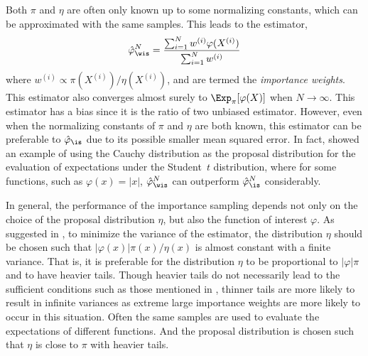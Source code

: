 Both $\pi$ and $\eta$ are often only known up to some normalizing constants,
which can be approximated with the same samples. This leads to the estimator,
\begin{equation}
  \hat\varphi_{\wis}^N
  = \frac{\sum_{i=1}^Nw^{(i)}\varphi(X^{(i)})}{\sum_{i=1}^Nw^{(i)}}
  \label{eq:is unnormalized}
\end{equation}
where $w^{(i)} \propto \pi(X^{(i)})/\eta(X^{(i)})$, and are termed the
\emph{importance weights}. This estimator also converges almost surely to
$\Exp_{\pi}[\varphi(X)]$ when $N\to\infty$. This estimator has a bias since
it is the ratio of two unbiased estimator. However, even when the normalizing
constants of $\pi$ and $\eta$ are both known, this estimator can be
preferable to $\hat\varphi_{\is}$ due to its possible smaller mean squared
error. In fact, \cite{Casella:1998tj} showed an example of using the Cauchy
distribution as the proposal distribution for the evaluation of expectations
under the Student~$t$ distribution, where for some functions, such as
$\varphi(x) = |x|$, $\hat\varphi_{\wis}^N$ can outperform
$\hat\varphi_{\is}^N$ considerably.

In general, the performance of the importance sampling depends not only on
the choice of the proposal distribution $\eta$, but also the function of
interest $\varphi$. As suggested in \cite[][sec.~3.3.2]{Robert:2004tn}, to
minimize the variance of the estimator, the distribution $\eta$ should be
chosen such that $|\varphi(x)|\pi(x)/\eta(x)$ is almost constant with a
finite variance. That is, it is preferable for the distribution $\eta$ to be
proportional to $|\varphi|\pi$ and to have heavier tails. Though heavier
tails do not necessarily lead to the sufficient conditions such as those
mentioned in \cite{Geweke:1989tm}, thinner tails are more likely to result in
infinite variances as extreme large importance weights are more likely to
occur in this situation. Often the same samples are used to evaluate the
expectations of different functions. And the proposal distribution is chosen
such that $\eta$ is close to $\pi$ with heavier tails.


